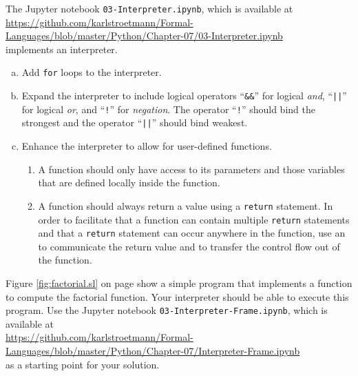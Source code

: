 \noindent
The Jupyter notebook \texttt{03-Interpreter.ipynb}, which is available at
\\[0.2cm]
\hspace*{0.3cm}
\href{https://github.com/karlstroetmann/Formal-Languages/blob/master/Python/Chapter-07/03-Interpreter.ipynb}{https://github.com/karlstroetmann/Formal-Languages/blob/master/Python/Chapter-07/03-Interpreter.ipynb}
\\[0.2cm]
implements an interpreter.

\exerciseEng
\begin{enumerate}[(a)]
\item Add \texttt{for} loops to the interpreter.
\item Expand the interpreter to include logical operators
      ``\texttt{\&\&}'' for logical \emph{and}, ``\texttt{||}'' for logical \emph{or},
      and ``\texttt{!}'' for \emph{negation}. The operator ``\texttt{!}'' should bind the
      strongest and the operator ``\texttt{||}'' should bind weakest.
\item Enhance the interpreter to allow for user-defined functions.
      \begin{enumerate}[1.]
      \item A function should only have access to its parameters and those variables that
            are defined locally inside the function.  
      \item A function should always return a value using a \texttt{return} statement.
            In order to facilitate that a function can contain multiple \texttt{return}
            statements and that a \texttt{return} statement can occur
            anywhere in the function,  use an  to communicate the
            return value and to transfer the control flow out of the function.
      \end{enumerate}
\end{enumerate}
Figure \ref{fig:factorial.sl} on page \pageref{fig:factorial.sl} show a simple program
that implements a function to compute the factorial function.  Your interpreter should be able to execute this
program.
Use the Jupyter notebook \texttt{03-Interpreter-Frame.ipynb}, which is available at
\\[0.2cm]
\hspace*{0.3cm}
\href{https://github.com/karlstroetmann/Formal-Languages/blob/master/Python/Chapter-07/Interpreter-Frame.ipynb}{https://github.com/karlstroetmann/Formal-Languages/blob/master/Python/Chapter-07/Interpreter-Frame.ipynb}
\\[0.2cm]
as a starting point for your solution.
\eox

